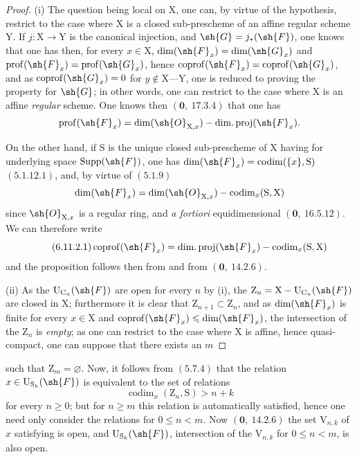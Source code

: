 \begin{proof}
(i) The question being local on $\mathrm{X}$, one can, by virtue of the hypothesis, restrict to the
case where $\mathrm{X}$ is a closed sub-prescheme of an affine regular scheme $\mathrm{Y}$. If $j:\mathrm{X}\to\mathrm{Y}$ is
the canonical injection, and $\sh{G}=j_*(\sh{F})$, one knows that one has then, for every $x\in\mathrm{X}$,
$\dim(\sh{F}_x)=\dim(\sh{G}_x)$ and $\operatorname{prof}(\sh{F}_x)=\operatorname{prof}(\sh{G}_x)$, hence $\operatorname{coprof}(\sh{F}_x)=\operatorname{coprof}(\sh{G}_x)$, and as
$\operatorname{coprof}(\sh{G}_x)=0$ for $y\notin\mathrm{X}\text{---}\mathrm{Y}$, one is reduced to proving the property for $\sh{G}$;
in other words, one can restrict to the case where $\mathrm{X}$ is an affine \emph{regular} scheme. One knows then $(\mathbf{0},~17.3.4)$
that one has
\[
  \operatorname{prof}(\sh{F}_x)=\dim(\sh{O}_{\mathrm{X},x})-\operatorname{dim.proj}(\sh{F}_x).
\]

On the other hand, if $\mathrm{S}$ is the unique closed sub-prescheme of $\mathrm{X}$ having for underlying space
$\operatorname{Supp}(\sh{F})$, one has $\dim(\sh{F}_x)=\operatorname{codim}(\{x\},\mathrm{S})$ $(5.1.12.1)$, and, by virtue of $(5.1.9)$
\[
  \dim(\sh{F}_x)=\dim(\sh{O}_{\mathrm{X},x})-\operatorname{codim}_x(\mathrm{S},\mathrm{X})
\]
since $\sh{O}_{\mathrm{X},x}$ is a regular ring, and \emph{a fortiori} equidimensional $(\mathbf{0},~16.5.12)$. We
can therefore write
\begin{equation}
\tag{6.11.2.1}
\label{IV.6.11.2.1}
  \operatorname{coprof}(\sh{F}_x)=\operatorname{dim.proj}(\sh{F}_x)-\operatorname{codim}_x(\mathrm{S},\mathrm{X})
\end{equation}
and the proposition follows then from  and from $(\mathbf{0},~14.2.6)$.


(ii) As the $\mathrm{U}_{\mathrm{C}_n}(\sh{F})$ are open for every $n$ by (i), the $\mathrm{Z}_n=\mathrm{X}-\mathrm{U}_{\mathrm{C}_n}(\sh{F})$
are closed in $\mathrm{X}$; furthermore it is clear that $\mathrm{Z}_{n+1}\subset\mathrm{Z}_n$, and as $\dim(\sh{F}_x)$ is finite
for every $x\in\mathrm{X}$ and $\operatorname{coprof}(\sh{F}_x)\leqslant\dim(\sh{F}_x)$, the intersection of the $\mathrm{Z}_n$ is \emph{empty}; as one can
restrict to the case where $\mathrm{X}$ is affine, hence quasi-compact, one can suppose that there exists an $m$
\end{proof}

such that $\mathrm{Z}_m=\varnothing$. Now, it follows from $(5.7.4)$ that the relation $x\in\mathrm{U}_{\mathrm{S}_k}(\sh{F})$ is equivalent to the set of
relations
\begin{equation}
\tag{6.11.2.2}
\label{IV.6.11.2.2}
  \operatorname{codim}_x(\mathrm{Z}_n,\mathrm{S})>n+k
\end{equation}
for every $n\geqslant 0$; but for $n\geqslant m$ this relation is automatically satisfied, hence one
need only consider the relations  for $0\leqslant n<m$. Now $(\mathbf{0},~14.2.6)$
the set $\mathrm{V}_{n,k}$ of $x$ satisfying  is open, and $\mathrm{U}_{\mathrm{S}_k}(\sh{F})$, intersection of the $\mathrm{V}_{n,k}$
for $0\leqslant n<m$, is also open.

